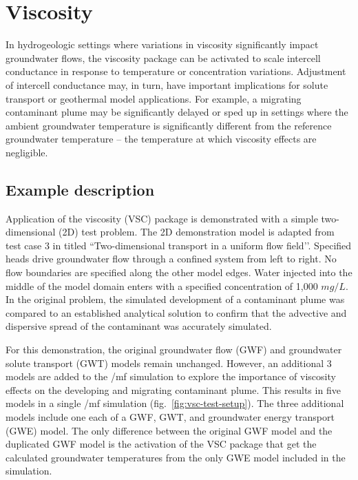 \section{Viscosity}

In hydrogeologic settings where variations in viscosity significantly impact groundwater flows, the viscosity package can be activated to scale intercell conductance in response to temperature or concentration variations.  Adjustment of intercell conductance may, in turn, have important implications for solute transport or geothermal model applications.  For example, a migrating contaminant plume may be significantly delayed or sped up in settings where the ambient groundwater temperature is significantly different from the reference groundwater temperature – the temperature at which viscosity effects are negligible.

\subsection{Example description}

Application of the viscosity (VSC) package is demonstrated with a simple two-dimensional (2D) test problem.  The 2D demonstration model is adapted from test case 3 in \cite{zheng1999mt3dms} titled ``Two-dimensional transport in a uniform flow field’’.  Specified heads drive groundwater flow through a confined system from left to right.  No flow boundaries are specified along the other model edges.  Water injected into the middle of the model domain enters with a specified concentration of 1,000 $mg/L$.  In the original problem, the simulated development of a contaminant plume was compared to an established analytical solution \citep{wilson1978} to confirm that the advective and dispersive spread of the contaminant was accurately simulated.

For this demonstration, the original groundwater flow (GWF) and groundwater solute transport (GWT) models remain unchanged.  However, an additional 3 models are added to the /mf simulation to explore the importance of viscosity effects on the developing and migrating contaminant plume.  This results in five models in a single /mf simulation (fig.~\ref{fig:vsc-test-setup}).  The three additional models include one each of a GWF, GWT, and groundwater energy transport (GWE) model. The only difference between the original GWF model and the duplicated GWF model is the activation of the VSC package that get the calculated groundwater temperatures from the only GWE model included in the simulation.

